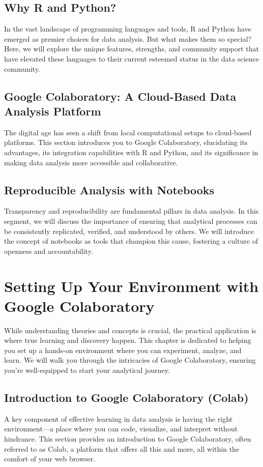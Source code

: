 \documentclass{book}
\begin{document}
\section{Why R and Python?}
In the vast landscape of programming languages and tools, R and Python have emerged as premier choices for data analysis. But what makes them so special? Here, we will explore the unique features, strengths, and community support that have elevated these languages to their current esteemed status in the data science community.

\section{Google Colaboratory: A Cloud-Based Data Analysis Platform}
The digital age has seen a shift from local computational setups to cloud-based platforms. This section introduces you to Google Colaboratory, elucidating its advantages, its integration capabilities with R and Python, and its significance in making data analysis more accessible and collaborative.

\section{Reproducible Analysis with Notebooks}
Transparency and reproducibility are fundamental pillars in data analysis. In this segment, we will discuss the importance of ensuring that analytical processes can be consistently replicated, verified, and understood by others. We will introduce the concept of notebooks as tools that champion this cause, fostering a culture of openness and accountability.

\chapter{Setting Up Your Environment with Google Colaboratory}
While understanding theories and concepts is crucial, the practical application is where true learning and discovery happen. This chapter is dedicated to helping you set up a hands-on environment where you can experiment, analyze, and learn. We will walk you through the intricacies of Google Colaboratory, ensuring you're well-equipped to start your analytical journey.

\section{Introduction to Google Colaboratory (Colab)}
A key component of effective learning in data analysis is having the right environment—a place where you can code, visualize, and interpret without hindrance. This section provides an introduction to Google Colaboratory, often referred to as Colab, a platform that offers all this and more, all within the comfort of your web browser.
\end{document}

